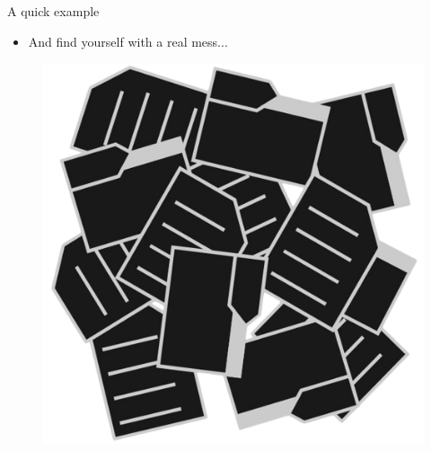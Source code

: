 \begin{frame}{A quick example}
\begin{itemize}
    \item And find yourself with a real mess...
\end{itemize}

\begin{figure}
    \centering
    \includegraphics[width=0.35\linewidth]{assets/pure_chaos_nobg.png}
    \label{fig:pure_chaos}
\end{figure}

\end{frame}


